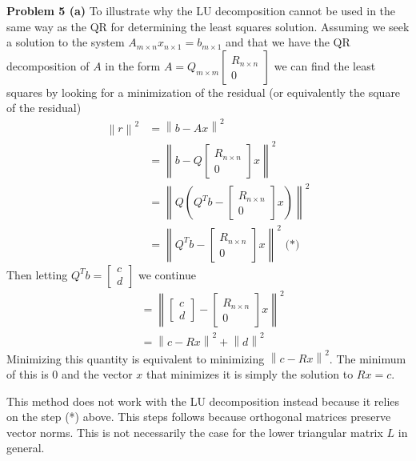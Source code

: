 \documentclass[12pt]{article}
\newcommand{\problem}[1]{\hspace{-4 ex} \large \textbf{Problem #1} }
\newcommand{\norm}[1]{\left\lVert#1\right\rVert}
\begin{document}
\problem{5 (a)} To illustrate why the LU decomposition cannot be used in the same way as the QR for determining the least squares solution. Assuming we seek a solution to the system $A_{m\times n}x_{n \times 1} = b_{m \times 1}$ and that we have the QR decomposition of $A$ in the form $A = Q_{m \times m} \begin{bmatrix} R_{n \times n} \\ 0\end{bmatrix}$ we can find the least squares by looking for a minimization of the residual (or equivalently the square of the residual)
\begin{align*}
	\norm{r}^2 & = \norm{b-Ax}^2 \\
	& = \norm{b- Q\begin{bmatrix} R_{n \times n} \\ 0\end{bmatrix}x}^2 \\
	& = \norm{Q(Q^Tb - \begin{bmatrix} R_{n \times n} \\ 0\end{bmatrix}x)}^2 \\
	& = \norm{Q^Tb - \begin{bmatrix} R_{n \times n} \\ 0\end{bmatrix}x}^2 \text{\ \ \ \ \ \ (*)}
\end{align*}
Then letting $Q^Tb = \begin{bmatrix} c \\ d\end{bmatrix}$ we continue
\begin{align*}
	& = \norm{\begin{bmatrix} c \\ d\end{bmatrix} - \begin{bmatrix} R_{n \times n} \\ 0\end{bmatrix}x}^2 \\
	& = \norm{c-Rx}^2 + \norm{d}^2
\end{align*}
Minimizing this quantity is equivalent to minimizing $\norm{c-Rx}^2$. The minimum of this is $0$ and the vector $x$ that minimizes it is simply the solution to $Rx = c$. \bigbreak

This method does not work with the LU decomposition instead because it relies on the step (*) above. This steps follows because orthogonal matrices preserve vector norms. This is not necessarily the case for the lower triangular matrix $L$ in general.
\end{document}
